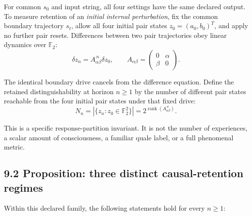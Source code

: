 \documentclass[
  11pt,
  a4paper,
]{article}
\begin{document}
For common \(s_0\) and input string, all four settings have the same
declared output. To measure retention of an \emph{initial internal
perturbation}, fix the common boundary trajectory \(s_t\), allow all
four initial pair states \(z_0=(a_0,b_0)^T\), and apply no further pair
resets. Differences between two pair trajectories obey linear dynamics
over \(\mathbb F_2\):
\nopagebreak[4]
\[
\delta z_n=A_{\alpha\beta}^{\,n}\delta z_0,\qquad
A_{\alpha\beta}=\begin{pmatrix}0&\alpha\\\beta&0\end{pmatrix}.
\]

The identical boundary drive cancels from the difference equation.
Define the retained distinguishability at horizon \(n\geq1\) by the
number of different pair states reachable from the four initial pair
states under that fixed drive:
\nopagebreak[4]
\[
N_n=|\{z_n:z_0\in\mathbb F_2^2\}|=2^{\operatorname{rank}(A_{\alpha\beta}^{\,n})}.
\]

This is a specific response-partition invariant. It is not the number of
experiences, a scalar amount of consciousness, a familiar quale label,
or a full phenomenal metric.

\hypertarget{proposition-three-distinct-causal-retention-regimes}{%
\subsection{9.2 Proposition: three distinct causal-retention
regimes}\label{proposition-three-distinct-causal-retention-regimes}}

Within this declared family, the following statements hold for every
\(n\geq1\):
\end{document}
